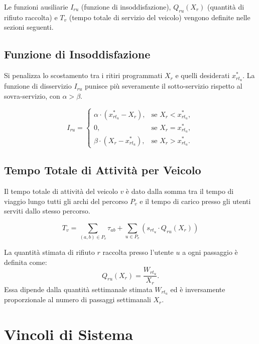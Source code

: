 \noindent
Le funzioni ausiliarie $I_{ru}$ (funzione di insoddisfazione), $Q_{ru}(X_r)$ (quantità di rifiuto raccolta) e $T_v$ (tempo totale di servizio del veicolo) vengono definite nelle sezioni seguenti.

\subsection{Funzione di Insoddisfazione}

Si penalizza lo scostamento tra i ritiri programmati $X_r$ e quelli desiderati $x^*_{r t_u}$. La funzione di disservizio $I_{ru}$ punisce più severamente il sotto-servizio rispetto al sovra-servizio, con $\alpha > \beta$.

\begin{equation}
I_{ru} =
\begin{cases}
\alpha \cdot \left(x^*_{r t_u} - X_r\right), & \text{se } X_r < x^*_{r t_u}, \\
0, & \text{se } X_r = x^*_{r t_u}, \\
\beta \cdot \left(X_r - x^*_{r t_u}\right), & \text{se } X_r > x^*_{r t_u}.
\end{cases}
\end{equation}


\subsection{Tempo Totale di Attività per Veicolo}

Il tempo totale di attività del veicolo $v$ è dato dalla somma tra il tempo di viaggio lungo tutti gli archi del percorso $P_v$ e il tempo di carico presso gli utenti serviti dallo stesso percorso.

\begin{equation}
T_v = \sum_{(a,b) \in P_v} \tau_{ab}
+ \sum_{u \in P_v} \left( s_{r t_u} \cdot Q_{ru}(X_r) \right)
\end{equation}

\noindent
La quantità stimata di rifiuto $r$ raccolta presso l'utente $u$ a ogni passaggio è definita come:
\begin{equation}
Q_{ru}(X_r) = \frac{W_{r t_u}}{X_r}.
\end{equation}
Essa dipende dalla quantità settimanale stimata $W_{r t_u}$ ed è inversamente proporzionale al numero di passaggi settimanali $X_r$.

\section{Vincoli di Sistema}

